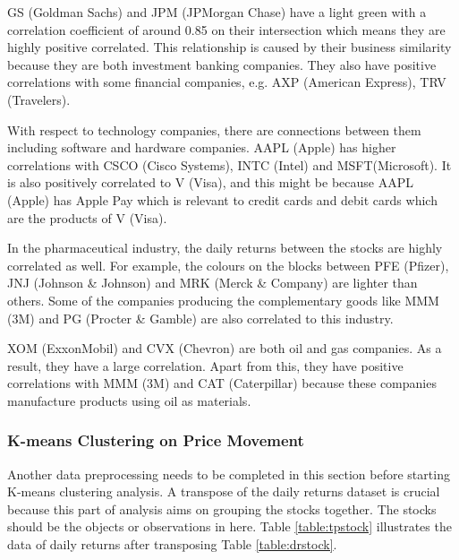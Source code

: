 \documentclass[11pt]{article} %
\theoremstyle{plain}
\theoremstyle{definition}
\begin{document}
GS (Goldman Sachs) and JPM (JPMorgan Chase) have a light green with a correlation coefficient of around 0.85 on their intersection which means they are highly positive correlated. This relationship is caused by their business similarity because they are both investment banking companies. They also have positive correlations with some financial companies, e.g. AXP (American Express), TRV (Travelers).

With respect to technology companies, there are connections between them including software and hardware companies. AAPL (Apple) has higher correlations with CSCO (Cisco Systems), INTC (Intel) and MSFT(Microsoft). It is also positively correlated to V (Visa), and this might be because AAPL (Apple) has Apple Pay which is relevant to credit cards and debit cards which are the products of V (Visa).

In the pharmaceutical industry, the daily returns between the stocks are highly correlated as well. For example, the colours on the blocks between PFE (Pfizer), JNJ (Johnson \& Johnson) and MRK (Merck \& Company) are lighter than others. Some of the companies producing the complementary goods like MMM (3M) and PG (Procter \& Gamble) are also correlated to this industry.

XOM (ExxonMobil) and CVX (Chevron) are both oil and gas companies. As a result, they have a large correlation. Apart from this, they have positive correlations with MMM (3M) and CAT (Caterpillar) because these companies manufacture products using oil as materials.

\subsubsection{K-means Clustering on Price Movement}

Another data preprocessing needs to be completed in this section before starting K-means clustering analysis. A transpose of the daily returns dataset is crucial because this part of analysis aims on grouping the stocks together. The stocks should be the objects or observations in here. Table \ref{table:tpstock} illustrates the data of daily returns after transposing Table \ref{table:drstock}.
\end{document}

